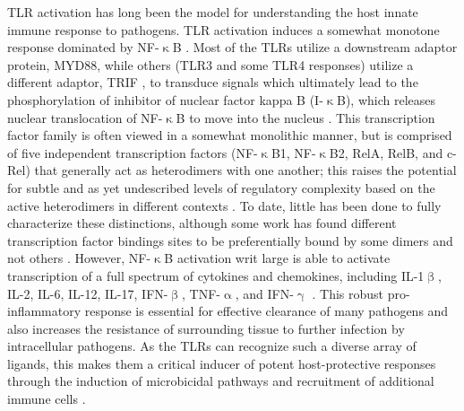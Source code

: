 TLR activation has long been the model for understanding the host innate immune response to pathogens. TLR activation induces a somewhat monotone response dominated by NF\hyp{}$\upkappa$B \citep{Arbibe2000, Kawai2007, Brandt2013, Kawai2009}. Most of the TLRs utilize a downstream adaptor protein, MYD88, while others (TLR3 and some TLR4 responses) utilize a different adaptor, TRIF \citep{Yamamoto2003}, to transduce signals which ultimately lead to the phosphorylation of inhibitor of nuclear factor kappa B (I\hyp{}$\upkappa$B), which releases nuclear translocation of NF\hyp{}$\upkappa$B to move into the nucleus \citep{Wright1990, Triantafilou2002, Kawai1999, Yamamoto2003, Akira2004, Kawasaki2014, Takeda2004}. This transcription factor family is often viewed in a somewhat monolithic manner, but is comprised of five independent transcription factors (NF\hyp{}$\upkappa$B1, NF\hyp{}$\upkappa$B2, RelA, RelB, and c\hyp{}Rel) that generally act as heterodimers with one another; this raises the potential for subtle and as yet undescribed levels of regulatory complexity based on the active heterodimers in different contexts \citep{Baeuerle1994, Finco1995, Rice1992, Oeckinghaus2009, Ghosh2012, Albensi2019, Liu2017}. To date, little has been done to fully characterize these distinctions, although some work has found different transcription factor bindings sites to be preferentially bound by some dimers and not others \citep{Siggers2011, Ramsey2019, Florio2022}. However, NF\hyp{}$\upkappa$B activation writ large is able to activate transcription of a full spectrum of cytokines and chemokines, including IL\hyp{}1$\upbeta$, IL\hyp{}2, IL\hyp{}6, IL\hyp{}12, IL\hyp{}17, IFN\hyp{}$\upbeta$, TNF\hyp{}$\upalpha$, and IFN\hyp{}$\upgamma$ \citep{Pahl1999, Liu2017}. This robust pro\hyp{}inflammatory response is essential for effective clearance of many pathogens and also increases the resistance of surrounding tissue to further infection by intracellular pathogens. As the TLRs can recognize such a diverse array of ligands, this makes them a critical inducer of potent host\hyp{}protective responses through the induction of microbicidal pathways and recruitment of additional immune cells \citep{Kawai2007, Kawasaki2014}. 

